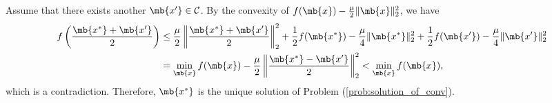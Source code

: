 \begin{exercise}
\begin{enumerate}
\begin{solution}
\begin{enumerate}
            Assume that there exists another $\mb{x'}\in \mathcal{C}$. By the convexity of $f(\mb{x}) - \frac{\mu}{2}\|\mb{x}\|_2^2$, we have 
            \begin{align*}
              f\left(\frac{\mb{x^*} + \mb{x'}}{2}\right) & \le \frac{\mu}{2}\left\|\frac{\mb{x^*} + \mb{x'}}{2}\right\|_2^2  + \frac{1}{2}f(\mb{x^*}) - \frac{\mu}{4}\|\mb{x^*}\|_2^2 + \frac{1}{2}f(\mb{x'}) - \frac{\mu}{4}\|\mb{x'}\|_2^2 \\
                                                         & = \min_{\mb{x}} f(\mb{x}) - \frac{\mu}{2}\left\|\frac{\mb{x^*} - \mb{x'}}{2}\right\|_2^2 < \min_{\mb{x}} f(\mb{x}),
            \end{align*}
            which is a contradiction. Therefore, $\mb{x^*}$ is the unique solution of Problem (\ref{prob:solution_of_conv}).
            \qedhere
        \end{enumerate}
      \end{solution}
      
  \end{enumerate}
  
\end{exercise}
\newpage



